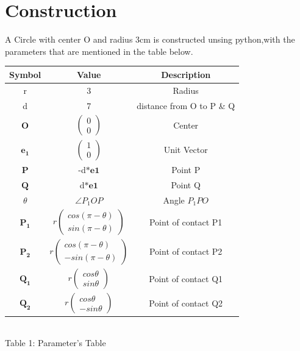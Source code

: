 \documentclass[journal,10pt,twocolumn]{article}
\let\vec\mathbf
\newcommand{\myvec}[1]{\ensuremath{\begin{pmatrix}#1\end{pmatrix}}}
\begin{document}
\section*{Construction}
\raggedright A Circle with center O and radius 3cm is constructed unsing python,with the parameters that are mentioned in the table below.
\vspace{5mm}
\begin{center}
    \setlength{\arrayrulewidth}{0.1mm}
	\setlength{\tabcolsep}{5pt}
	\renewcommand{\arraystretch}{1.5}
\begin{tabular}{|c|c|c|}
	\hline 
    \textbf{Symbol} & \textbf{Value} & \textbf{Description}\\ 		\hline
    r & 3 & Radius \\ \hline
    d & 7 & distance from O to P \& Q \\ \hline
    $\vec{O}$ & $\myvec{0 \\ 0}$ & Center \\ \hline
    $\vec{e_1}$ & $\myvec{1 \\ 0}$ & Unit Vector \\ \hline
    $\vec{P}$ & -d$\ast\vec{e1}$ & Point P \\ \hline
    $\vec{Q}$ & d$\ast\vec{e1}$ & Point Q \\ \hline
    $\theta$ & $\angle P_1OP$ & Angle $P_1PO$ \\ \hline
    $\vec{P_1}$ & $r\myvec{cos(\pi-\theta) \\ sin(\pi-\theta)}$ & 		Point of contact P1 \\ \hline
    $\vec{P_2}$ & $r\myvec{cos(\pi-\theta) \\ -sin(\pi-\theta)}$ & 		Point of contact P2 \\ \hline
    $\vec{Q_1}$ & $r\myvec{cos\theta \\ sin\theta}$ & Point of contact Q1 \\ \hline
    $\vec{Q_2}$ & $r\myvec{cos\theta \\ -sin\theta}$ & Point of contact Q2 \\ \hline
\end{tabular}\\ \vspace{2mm}
Table 1: Parameter's Table
\end{center}
 
\end{document}
